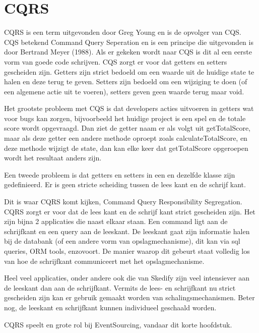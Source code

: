 
\chapter{CQRS}
\label{ch:CQRS}

CQRS is een term uitgevonden door Greg Young en is de opvolger van CQS. CQS betekend Command Query Seperation en is een principe die uitgevonden is door Bertrand Meyer (1988). Als er gekeken wordt naar CQS is dit al een eerste vorm van goede code schrijven. CQS zorgt er voor dat getters en setters gescheiden zijn. Getters zijn strict bedoeld om een waarde uit de huidige state te halen en deze terug te geven. Setters zijn bedoeld om een wijziging te doen (of een algemene actie uit te voeren), setters geven geen waarde terug maar void.

Het grootste probleem met CQS is dat developers acties uitvoeren in getters wat voor bugs kan zorgen, bijvoorbeeld het huidige project is een spel en de totale score wordt opgevraagd. Dan ziet de getter naam er als volgt uit getTotalScore, maar als deze getter een andere methode oproept zoals calculateTotalScore, en deze methode wijzigt de state, dan kan elke keer dat getTotalScore opgeroepen wordt het resultaat anders zijn.

Een tweede probleem is dat getters en setters in een en dezelfde klasse zijn gedefinieerd. Er is geen stricte scheiding tussen de lees kant en de schrijf kant.

Dit is waar CQRS komt kijken, Command Query Responsibility Segregation. CQRS zorgt er voor dat de lees kant en de schrijf kant strict gescheiden zijn. Het zijn bijna 2 applicaties die naast elkaar staan. Een command ligt aan de schrijfkant en een query aan de leeskant. De leeskant gaat zijn informatie halen bij de databank (of een andere vorm van opslagmechanisme), dit kan via sql queries, ORM tools, enzovoort. De manier waarop dit gebeurt staat volledig los van hoe de schrijfkant communiceert met het opslagmechanisme.

Heel veel applicaties, onder andere ook die van Skedify zijn veel intensiever aan de leeskant dan aan de schrijfkant. Vermits de lees- en schrijfkant nu strict gescheiden zijn kan er gebruik gemaakt worden van schalingsmechanismen. Beter nog, de leeskant en schrijfkant kunnen individueel geschaald worden.

CQRS speelt en grote rol bij EventSourcing, vandaar dit korte hoofdstuk.